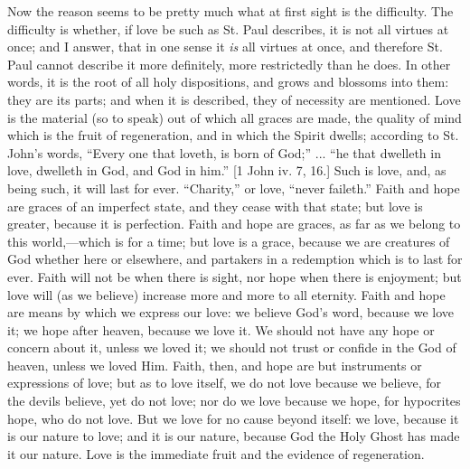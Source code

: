 Now the reason seems to be pretty much what at first sight is the
difficulty. The difficulty is whether, if love be such as St. Paul
describes, it is not all virtues at once; and I answer, that in one
sense it \emph{is} all virtues at once, and therefore St. Paul cannot
describe it more definitely, more restrictedly than he does. In other
words, it is the root of all holy dispositions, and grows and blossoms
into them: they are its parts; and when it is described, they of
necessity are mentioned. Love is the material (so to speak) out of
which all graces are made, the quality of mind which is the fruit of
regeneration, and in which the Spirit dwells; according to St. John's
words, ``Every one that loveth, is born of God;'' ... ``he
that dwelleth in love, dwelleth in God, and God in him.'' [1 John
iv. 7, 16.] Such is love, and, as being such, it will last for ever.
``Charity,'' or love, ``never faileth.'' Faith and
hope are graces of an imperfect state, and they cease with that state;
but love is greater, because it is perfection. Faith and hope are
graces, as far as we belong to this world,—which is for a time; but
love is a grace, because we are creatures of God whether here or
elsewhere, and partakers in a redemption which is to last for ever.
Faith will not be when there is sight, nor hope when there is
enjoyment; but love will (as we believe) increase more and more to all
eternity. Faith and hope are means by which we express our love: we
believe God's word, because we love it; we hope after heaven,
because we love it. We should not have any hope or concern about it,
unless we loved it; we should not trust or confide in the God of
heaven, unless we loved Him. Faith, then, and hope are but instruments
or expressions of love; but as to love itself, we do not love because
we believe, for the devils believe, yet do not love; nor do we love
because we hope, for hypocrites hope, who do not love. But we love for
no cause beyond itself: we love, because it is our nature to love; and
it is our nature, because God the Holy Ghost has made it our nature.
Love is the immediate fruit and the evidence of regeneration.

